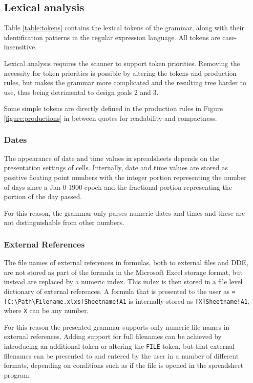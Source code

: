 \documentclass[conference]{IEEEtran}
\begin{document}
\subsection{Lexical analysis}

Table \ref{table:tokens} contains the lexical tokens of the grammar, along with their identification patterns in the regular expression language. All tokens are case-insensitive.

Lexical analysis requires the scanner to support token priorities. Removing the necessity for token priorities is possible by altering the tokens and production rules, but makes the grammar more complicated and the resulting tree harder to use, thus being detrimental to design goals 2 and 3.

Some simple tokens are directly defined in the production rules in Figure \ref{figure:productions} in between quotes for readability and compactness.

\subsubsection{\textbf{Dates}}

The appearance of date and time values in spreadsheets depends on the presentation settings of cells. Internally, date and time values are stored as positive floating point numbers with the integer portion representing the number of days since a Jan 0 1900 epoch and the fractional portion representing the portion of the day passed.

For this reason, the grammar only parses numeric dates and times and these are not distinguishable from other numbers.

\subsubsection{\textbf{External References}}

The file names of external references in formulas, both to external files and DDE, are not stored as part of the formula in the Microsoft Excel storage format, but instead are replaced by a numeric index.
This index is then stored in a file level dictionary of external references.
A formula that is presented to the user as \texttt{=[C:\textbackslash Path\textbackslash Filename.xlxs]Sheetname!A1} is internally stored as \texttt{[X]Sheetname!A1}, where \texttt{X} can be any number.

For this reason the presented grammar supports only numeric file names in external references.
Adding support for full filenames can be achieved by introducing an additional token or altering the \texttt{FILE} token, but that external filenames can be presented to and entered by the user in a number of different formats, depending on conditions such as if the file is opened in the spreadsheet program.
\end{document}
